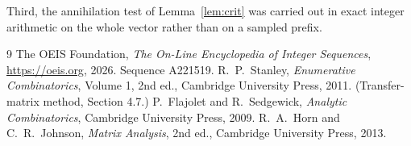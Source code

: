 \documentclass[11pt,a4paper]{article}
\theoremstyle{plain}
\theoremstyle{definition}
\begin{document}
Third, the annihilation test of Lemma~\ref{lem:crit} was carried out in exact integer
arithmetic on the whole vector rather than on a sampled prefix.

\begin{thebibliography}{9}
 The OEIS Foundation, \emph{The On-Line Encyclopedia of Integer
Sequences}, \url{https://oeis.org}, 2026. Sequence A221519.
 R.~P.~Stanley, \emph{Enumerative Combinatorics}, Volume 1, 2nd ed.,
Cambridge University Press, 2011. (Transfer-matrix method, Section 4.7.)
 P.~Flajolet and R.~Sedgewick, \emph{Analytic Combinatorics}, Cambridge
University Press, 2009.
 R.~A.~Horn and C.~R.~Johnson, \emph{Matrix Analysis}, 2nd ed., Cambridge
University Press, 2013.
\end{thebibliography}
\end{document}
